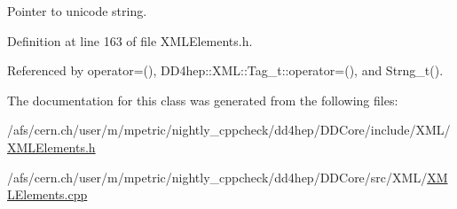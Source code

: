 Pointer to unicode string. 



Definition at line 163 of file X\+M\+L\+Elements.\+h.



Referenced by operator=(), D\+D4hep\+::\+X\+M\+L\+::\+Tag\+\_\+t\+::operator=(), and Strng\+\_\+t().



The documentation for this class was generated from the following files\+:\begin{DoxyCompactItemize}
\item 
/afs/cern.\+ch/user/m/mpetric/nightly\+\_\+cppcheck/dd4hep/\+D\+D\+Core/include/\+X\+M\+L/\hyperlink{_x_m_l_elements_8h}{X\+M\+L\+Elements.\+h}\item 
/afs/cern.\+ch/user/m/mpetric/nightly\+\_\+cppcheck/dd4hep/\+D\+D\+Core/src/\+X\+M\+L/\hyperlink{_x_m_l_elements_8cpp}{X\+M\+L\+Elements.\+cpp}\end{DoxyCompactItemize}
